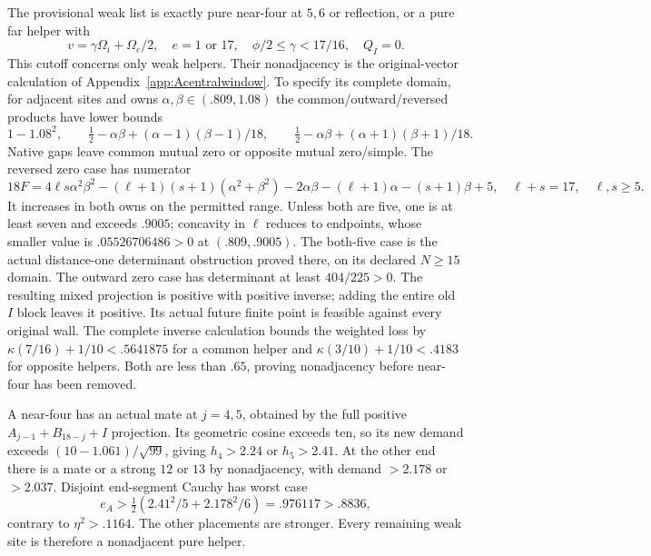 \documentclass[11pt]{article}
\theoremstyle{definition}
\theoremstyle{remark}
\begin{document}
The provisional weak list is exactly pure near-four at \(5,6\)
or reflection, or a pure far helper with
\[
 v=\gamma\Omega_i+\Omega_e/2,\quad e=1\text{ or }17,\quad
 \phi/2\leq\gamma<17/16,\quad Q_I=0 .
\]
This cutoff concerns only weak helpers.
Their nonadjacency is the original-vector calculation of
Appendix~\ref{app:Acentralwindow}. To specify its complete domain,
for adjacent sites and owns \(\alpha,\beta\in(.809,1.08)\)
the common/outward/reversed products have lower bounds
\[
 1-1.08^2,\qquad
 \tfrac12-\alpha\beta+(\alpha-1)(\beta-1)/18,\qquad
 \tfrac12-\alpha\beta+(\alpha+1)(\beta+1)/18 .
\]
Native gaps leave common mutual zero or opposite mutual zero/simple.
The reversed zero case has numerator
\[
 18F=4\ell s\alpha^2\beta^2-(\ell+1)(s+1)(\alpha^2+\beta^2)
       -2\alpha\beta-(\ell+1)\alpha-(s+1)\beta+5,
 \quad \ell+s=17,\quad\ell,s\geq5 .
\]
It increases in both owns on the permitted range. Unless both are
five, one is at least seven and exceeds \(.9005\);
concavity in \(\ell\) reduces to endpoints, whose smaller value is
\(.05526706486>0\) at \((.809,.9005)\).
The both-five case is the actual distance-one determinant obstruction
proved there, on its declared \(N\geq15\) domain.
The outward zero case has determinant at least \(404/225>0\).
The resulting mixed projection is positive with positive inverse;
adding the entire old \(I\) block leaves it positive.
Its actual future finite point is feasible against every original wall.
The complete inverse calculation bounds the weighted loss by
\(\kappa(7/16)+1/10<.5641875\) for a common helper and
\(\kappa(3/10)+1/10<.4183\) for opposite helpers.
Both are less than \(.65\), proving nonadjacency before near-four
has been removed.

A near-four has an actual mate at \(j=4,5\), obtained by the full
positive \(A_{j-1}+B_{18-j}+I\) projection.
Its geometric cosine exceeds ten, so its new demand exceeds
\((10-1.061)/\sqrt{99}\), giving \(h_4>2.24\) or \(h_5>2.41\).
At the other end there is a mate or a strong \(12\) or \(13\)
by nonadjacency, with demand \(>2.178\) or \(>2.037\).
Disjoint end-segment Cauchy has worst case
\[
 e_A>\tfrac12(2.41^2/5+2.178^2/6)=.976117>.8836,
\]
contrary to \(\eta^2>.1164\). The other placements are stronger.
Every remaining weak site is therefore a nonadjacent pure helper.
\end{document}
